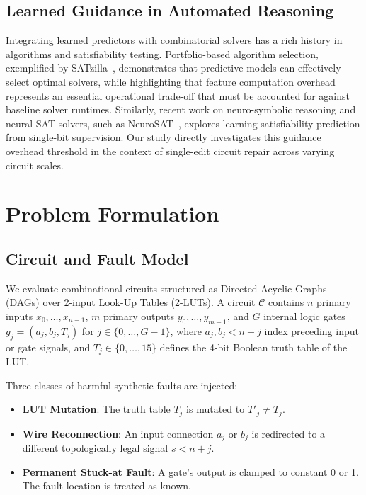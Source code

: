 \documentclass[11pt,a4paper]{article}
\begin{document}
\subsection{Learned Guidance in Automated Reasoning}
Integrating learned predictors with combinatorial solvers has a rich history in algorithms and satisfiability testing. Portfolio-based algorithm selection, exemplified by SATzilla~\citep{xu2008satzilla}, demonstrates that predictive models can effectively select optimal solvers, while highlighting that feature computation overhead represents an essential operational trade-off that must be accounted for against baseline solver runtimes. Similarly, recent work on neuro-symbolic reasoning and neural SAT solvers, such as NeuroSAT~\citep{selsam2019learning}, explores learning satisfiability prediction from single-bit supervision. Our study directly investigates this guidance overhead threshold in the context of single-edit circuit repair across varying circuit scales.

\section{Problem Formulation}

\subsection{Circuit and Fault Model}
We evaluate combinational circuits structured as Directed Acyclic Graphs (DAGs) over 2-input Look-Up Tables (2-LUTs). A circuit $\mathcal{C}$ contains $n$ primary inputs $x_0, \dots, x_{n-1}$, $m$ primary outputs $y_0, \dots, y_{m-1}$, and $G$ internal logic gates $g_j = (a_j, b_j, T_j)$ for $j \in \{0, \dots, G-1\}$, where $a_j, b_j < n + j$ index preceding input or gate signals, and $T_j \in \{0, \dots, 15\}$ defines the 4-bit Boolean truth table of the LUT.

Three classes of harmful synthetic faults are injected:
\begin{itemize}
    \item \textbf{LUT Mutation}: The truth table $T_j$ is mutated to $T'_j \ne T_j$.
    \item \textbf{Wire Reconnection}: An input connection $a_j$ or $b_j$ is redirected to a different topologically legal signal $s < n + j$.
    \item \textbf{Permanent Stuck-at Fault}: A gate's output is clamped to constant 0 or 1. The fault location is treated as known.
\end{itemize}
\end{document}
